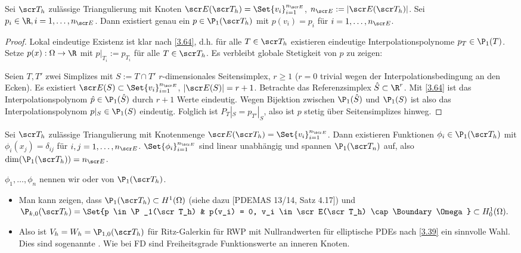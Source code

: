 \begin{st} \label{3.65}
	Sei $\scr T_h$ zulässige Triangulierung mit Knoten $\scr E(\scr T_h) = \Set{v_i}_{i=1}^{n_{\scr E}}$, $n_{\scr E} := |\scr E(\scr T_h)|$.
	Sei $p_i \in \R, i = 1, \dotsc, n_{\scr E}$.
	Dann existiert genau ein $p \in \P_1(\scr T_h)$ mit $p(v_i) = p_i$ für $i = 1, \dotsc, n_{\scr E}$.
	\begin{proof}
		Lokal eindeutige Existenz ist klar nach \ref{3.64}, d.h. für alle $T \in \scr T_h$ existieren eindeutige Interpolationspolynome $p_T \in \P_1(T)$.
		Setze $p(x) : \Omega \to \R$ mit $p|_{T_i} := p_{T_i}$ für alle $T \in \scr T_h$.
		Es verbleibt globale Stetigkeit von $p$ zu zeigen:

		Seien $T, T'$ zwei Simplizes mit $S := T \cap T'$ $r$-dimensionales Seitensimplex, $r \ge 1$ ($r = 0$ trivial wegen der Interpolationsbedingung an den Ecken).
		Es existiert $\scr E(S) \subset \Set{v_i}_{i=1}^{n_{\scr E}}$, $|\scr E(S)| = r + 1$.
		Betrachte das Referenzsimplex $\hat S \subset \R^r$.
		Mit \ref{3.64} ist das Interpolationspolynom $\hat p \in \P_1(\hat S)$ durch $r + 1$ Werte eindeutig.
		Wegen Bijektion zwischen $\P_1(\hat S)$ und $\P_1(S)$ ist also das Interpolationspolynom $p|_S \in \P_1(S)$ eindeutig.
		Folglich ist $P_T|_S = p_{T'}|_S$, also ist $p$ stetig über Seitensimplizes hinweg.
	\end{proof}
\end{st}

\begin{df}[Lagrange-Basis, $k = 1$] \label{3.66}
	Sei $\scr T_h$ zulässige Triangulierung mit Knotenmenge $\scr E(\scr T_h) = \Set{v_i}_{i=1}^{n_{\scr E}}$.
	Dann existieren Funktionen $\phi_i \in \P_1(\scr T_h)$ mit $\phi_i(x_j) = \delta_{ij}$ für $i, j = 1, \dotsc, n_{\scr E}$.
	$\Set{\phi_i}_{i=1}^{n_{\scr E}}$ sind linear unabhängig und spannen $\P_1(\scr T_n)$ auf, also $\dim(\P_1(\scr T_h)) = n_{\scr E}$.

	$\phi_1, \dotsc, \phi_n$ nennen wir  oder  von $\P_1(\scr T_h)$.
\end{df}

\begin{note}
	\begin{itemize}
		\item
			Man kann zeigen, dass $\P_1(\scr T_h) \subset H^1(\Omega)$ (siehe dazu [PDEMAS 13/14, Satz 4.17]) und
			\begin{math}
				\P_{k,0} (\scr T_h) = \Set{p \in \P_1(\scr T_h) & p(v_i) = 0, v_i \in \scr E(\scr T_h) \cap \Boundary \Omega }
				\subset H_0^1(\Omega).
			\end{math}
		\item
			Also ist $V_h = W_h = \P_{1,0}(\scr T_h)$ für Ritz-Galerkin für RWP mit Nullrandwerten für elliptische PDEs nach \ref{3.39} ein sinnvolle Wahl.
			Dies sind sogenannte .
			Wie bei FD sind Freiheitsgrade Funktionswerte an inneren Knoten.
	\end{itemize}
\end{note}

